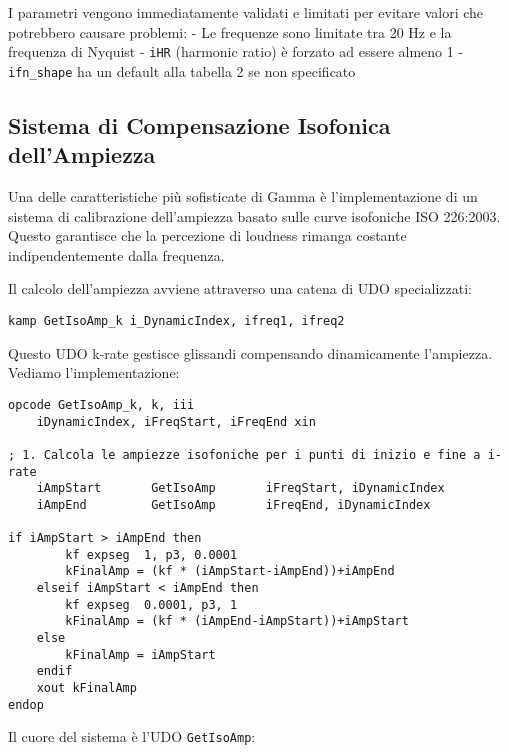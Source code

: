 I parametri vengono immediatamente validati e limitati per evitare valori che potrebbero causare problemi:
- Le frequenze sono limitate tra 20 Hz e la frequenza di Nyquist
- \texttt{iHR} (harmonic ratio) è forzato ad essere almeno 1
- \texttt{ifn\_shape} ha un default alla tabella 2 se non specificato
\subsection{Sistema di Compensazione Isofonica dell'Ampiezza}
Una delle caratteristiche più sofisticate di Gamma è l'implementazione di un sistema di calibrazione dell'ampiezza basato sulle curve isofoniche ISO 226:2003. Questo garantisce che la percezione di loudness rimanga costante indipendentemente dalla frequenza.

Il calcolo dell'ampiezza avviene attraverso una catena di UDO specializzati:

\begin{lstlisting}[language=Csound]
kamp GetIsoAmp_k i_DynamicIndex, ifreq1, ifreq2
\end{lstlisting}

Questo UDO k-rate gestisce glissandi compensando dinamicamente l'ampiezza. Vediamo l'implementazione:

\begin{lstlisting}[language=Csound]
opcode GetIsoAmp_k, k, iii
    iDynamicIndex, iFreqStart, iFreqEnd xin

; 1. Calcola le ampiezze isofoniche per i punti di inizio e fine a i-rate
    iAmpStart       GetIsoAmp       iFreqStart, iDynamicIndex
    iAmpEnd         GetIsoAmp       iFreqEnd, iDynamicIndex

if iAmpStart > iAmpEnd then
        kf expseg  1, p3, 0.0001
        kFinalAmp = (kf * (iAmpStart-iAmpEnd))+iAmpEnd
    elseif iAmpStart < iAmpEnd then
        kf expseg  0.0001, p3, 1
        kFinalAmp = (kf * (iAmpEnd-iAmpStart))+iAmpStart
    else
        kFinalAmp = iAmpStart
    endif
    xout kFinalAmp
endop
\end{lstlisting}

Il cuore del sistema è l'UDO \texttt{GetIsoAmp}:

